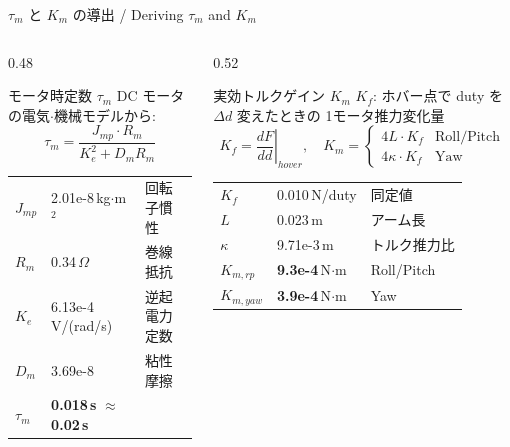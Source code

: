 \begin{frame}{$\tau_m$ と $K_m$ の導出 / Deriving $\tau_m$ and $K_m$}
  \vspace{-2mm}
  \begin{columns}[t]
    \begin{column}{0.48\textwidth}
      \begin{block}{モータ時定数 $\tau_m$}\small
        DC モータの電気$\cdot$機械モデルから:
        \vspace{-0.5em}
        \[
          \tau_m = \frac{J_{mp} \cdot R_m}{K_e^2 + D_m R_m}
        \]
        \vspace{-1.5em}
      \end{block}
      \vspace{-0.2em}
      {\scriptsize
      \begin{tabular}{lll}
        \hline
        $J_{mp}$ & 2.01e-8\,kg$\cdot$m$^2$ & 回転子慣性 \\
        $R_m$    & 0.34\,$\Omega$    & 巻線抵抗 \\
        $K_e$    & 6.13e-4\,V/(rad/s) & 逆起電力定数 \\
        $D_m$    & 3.69e-8 & 粘性摩擦 \\
        \hline
        $\tau_m$ & \textbf{0.018\,s} $\approx$ \textbf{0.02\,s} & \\
        \hline
      \end{tabular}}
    \end{column}
    \begin{column}{0.52\textwidth}
      \begin{block}{実効トルクゲイン $K_m$}\small
        $K_f$: ホバー点で duty を $\Delta d$ 変えたときの
        1モータ推力変化量\vspace{-0.3em}
        \[
          K_f = \left.\frac{dF}{dd}\right|_{\!hover}\!,\quad
          K_m = \begin{cases}
            4L \cdot K_f & \text{Roll/Pitch}\\
            4\kappa \cdot K_f & \text{Yaw}
          \end{cases}
        \]
        \vspace{-1.5em}
      \end{block}
      \vspace{-0.2em}
      {\scriptsize
      \begin{tabular}{lll}
        \hline
        $K_f$       & 0.010\,N/duty & 同定値 \\
        $L$         & 0.023\,m & アーム長 \\
        $\kappa$    & 9.71e-3\,m & トルク推力比 \\
        \hline
        $K_{m,rp}$  & \textbf{9.3e-4}\,N$\cdot$m & Roll/Pitch \\
        $K_{m,yaw}$ & \textbf{3.9e-4}\,N$\cdot$m & Yaw \\
        \hline
      \end{tabular}}
    \end{column}
  \end{columns}


\end{frame}
